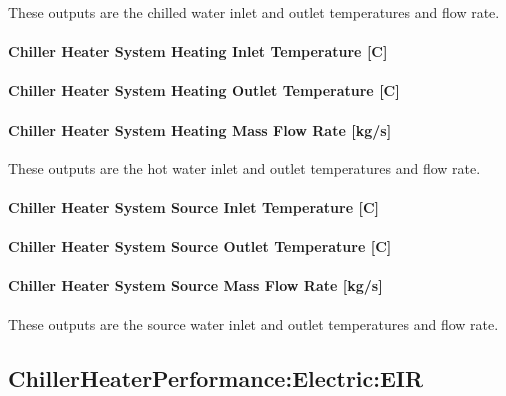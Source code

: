 These outputs are the chilled water inlet and outlet temperatures and flow rate.

\paragraph{Chiller Heater System Heating Inlet Temperature {[}C{]}}\label{chiller-heater-system-heating-inlet-temperature-c}

\paragraph{Chiller Heater System Heating Outlet Temperature {[}C{]}}\label{chiller-heater-system-heating-outlet-temperature-c}

\paragraph{Chiller Heater System Heating Mass Flow Rate {[}kg/s{]}}\label{chiller-heater-system-heating-mass-flow-rate-kgs}

These outputs are the hot water inlet and outlet temperatures and flow rate.

\paragraph{Chiller Heater System Source Inlet Temperature {[}C{]}}\label{chiller-heater-system-source-inlet-temperature-c}

\paragraph{Chiller Heater System Source Outlet Temperature {[}C{]}}\label{chiller-heater-system-source-outlet-temperature-c}

\paragraph{Chiller Heater System Source Mass Flow Rate {[}kg/s{]}}\label{chiller-heater-system-source-mass-flow-rate-kgs}

These outputs are the source water inlet and outlet temperatures and flow rate.

\subsection{ChillerHeaterPerformance:Electric:EIR}\label{chillerheaterperformancelectriceir}

